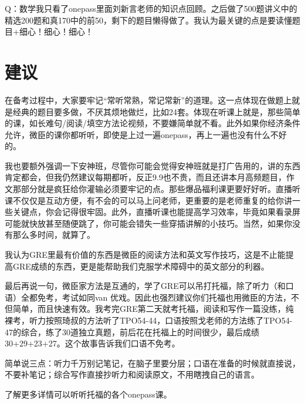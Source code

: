 \documentclass[cn,plain]{./src/qyxfbook}
\begin{document}
			
			Q：数学我只看了onepass里面刘新言老师的知识点回顾。之后做了500题讲义中的精选200题和真170中的前50，剩下的题目懒得做了。我认为最关键的点是要读懂题目+细心！细心！细心！		
		
			
		\section{建议}
			在备考过程中，大家要牢记“常听常熟，常记常新”的道理。这一点体现在做题上就是经典的题目要多做，不厌其烦地做烂，比如24套。体现在听课上就是，那些简单的课，如长难句/阅读/填空方法论视频，不要嫌简单就不看。此外如果你经济条件允许，微臣的课你都听听，即使是上过一遍onepass，再上一遍也没有什么不好的。\par
			我也要额外强调一下安神班，尽管你可能会觉得安神班就是打广告用的，讲的东西肯定都会，但我仍然建议每期都听，反正9.9也不贵，而且还讲本月高频题目，作文那部分就是疯狂给你灌输必须要牢记的点。那些爆品福利课更要好好听。直播听课不仅仅是互动方便，有不会的可以马上问老师，更重要的是老师重复的给你讲一些关键点，你会记得很牢固。此外，直播听课也能提高学习效率，毕竟如果看录屏可能就快放甚至随便跳了，你可能会错失一些穿插讲解的小技巧。当然，如果你没有那么多时间，就算了。\par
			我认为GRE里最有价值的东西是微臣的阅读方法和英文写作技巧，这是不止能提高GRE成绩的东西，更是能帮助我们克服学术障碍中的英文部分的利器。\par
			最后再说一句，微臣家方法是互通的，学了GRE可以吊打托福，除了听力（和口语）全都免考，考试如同van \male 优戏。因此也强烈建议你们托福也用微臣的方法，不但简单，而且快速有效。我考完GRE第二天就考托福，阅读和写作一篇没练，纯裸考，听力按照琦叔的方法听了TPO54-44，口语按照戈老师的方法练了TPO54-47的综合，练了30道独立真题，前后花在托福上的时间很少，最后成绩30+29+23+27。这个故事告诉我们口语不免考。\par
			简单说三点：听力千万别记笔记，在脑子里要分层；口语在准备的时候就直接说，不要补笔记；综合写作直接抄听力和阅读原文，不用瞎拽自己的语言。\par
			了解更多详情可以听听托福的各个onepass课。
		
\end{document}
